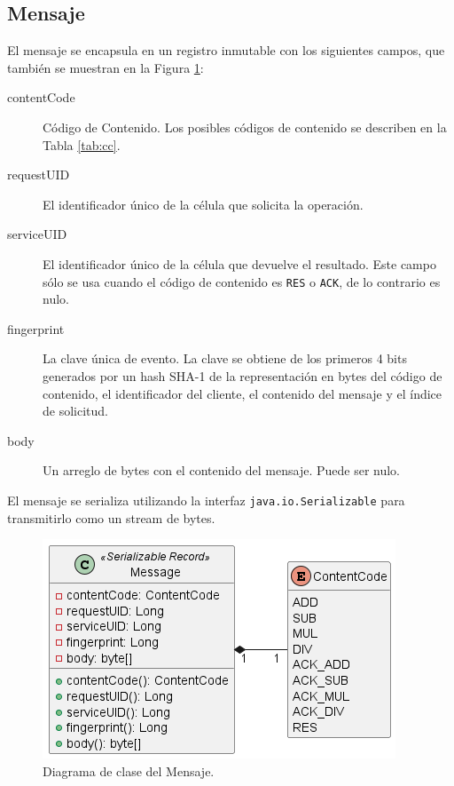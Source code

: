 \documentclass[conference,compsoc]{IEEEtran}
\begin{document}
\subsection{Mensaje}\label{sec:msg}

El mensaje se encapsula en un registro inmutable con los siguientes campos, que también se muestran en la Figura \ref{fig:message}:
\begin{description}
    \item[contentCode] Código de Contenido. Los posibles códigos de contenido se describen en la Tabla \ref{tab:cc}.
    \item[requestUID] El identificador único de la célula que solicita la operación.
    \item[serviceUID] El identificador único de la célula que devuelve el resultado. Este campo sólo se usa cuando el código de contenido es \texttt{RES} o \texttt{ACK}, de lo contrario es nulo.
    \item[fingerprint] La clave única de evento. La clave se obtiene de los primeros 4 bits generados por un hash SHA-1 de la representación en bytes del código de contenido, el identificador del cliente, el contenido del mensaje y el índice de solicitud.
    \item[body] Un arreglo de bytes con el contenido del mensaje. Puede ser nulo.
\end{description}

El mensaje se serializa utilizando la interfaz \texttt{java.io.Serializable} para transmitirlo como un stream de bytes.

\begin{figure}[hbt]
    \centering
    \includegraphics[width=0.9\columnwidth]{message.png}
    \caption{Diagrama de clase del Mensaje.}
    \label{fig:message}
\end{figure}
\end{document}
